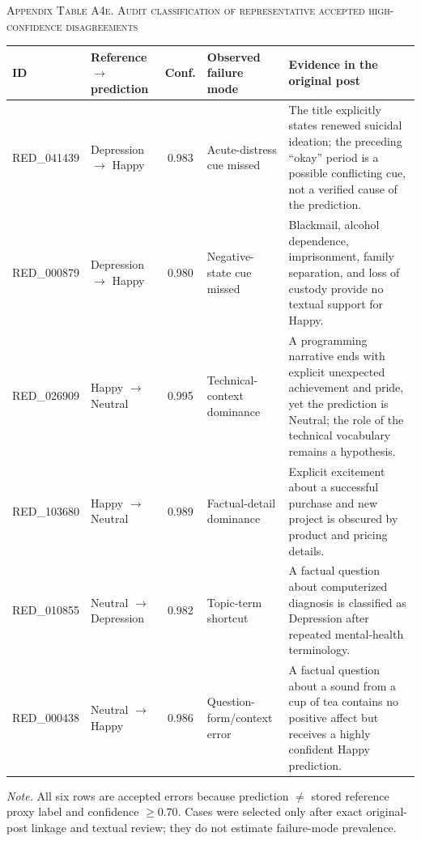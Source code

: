 \documentclass{ieeeaccess}
\begin{document}
\par\medskip
{}
\noindent\textsc{Appendix Table A4e. Audit classification of representative accepted high-confidence disagreements}\par
\label{tab:appendix-a4e-accepted-errors}
\smallskip
\footnotesize
\setlength{\tabcolsep}{3.2pt}
\renewcommand{\arraystretch}{1.16}
\noindent\begin{tabularx}{\textwidth}{@{}p{}p{}c p{}Y@{}}
\toprule
ID & Reference $\rightarrow$ prediction & Conf. & Observed failure mode & Evidence in the original post \\
\midrule
RED\_041439 & Depression $\rightarrow$ Happy & 0.983 & Acute-distress cue missed & The title explicitly states renewed suicidal ideation; the preceding ``okay'' period is a possible conflicting cue, not a verified cause of the prediction. \\
RED\_000879 & Depression $\rightarrow$ Happy & 0.980 & Negative-state cue missed & Blackmail, alcohol dependence, imprisonment, family separation, and loss of custody provide no textual support for Happy. \\
RED\_026909 & Happy $\rightarrow$ Neutral & 0.995 & Technical-context dominance & A programming narrative ends with explicit unexpected achievement and pride, yet the prediction is Neutral; the role of the technical vocabulary remains a hypothesis. \\
RED\_103680 & Happy $\rightarrow$ Neutral & 0.989 & Factual-detail dominance & Explicit excitement about a successful purchase and new project is obscured by product and pricing details. \\
RED\_010855 & Neutral $\rightarrow$ Depression & 0.982 & Topic-term shortcut & A factual question about computerized diagnosis is classified as Depression after repeated mental-health terminology. \\
RED\_000438 & Neutral $\rightarrow$ Happy & 0.986 & Question-form/context error & A factual question about a sound from a cup of tea contains no positive affect but receives a highly confident Happy prediction. \\
\bottomrule
\end{tabularx}
\par\smallskip
\noindent\footnotesize\textit{Note.} All six rows are accepted errors because prediction $\ne$ stored reference proxy label and confidence $\geq0.70$. Cases were selected only after exact original-post linkage and textual review; they do not estimate failure-mode prevalence.\normalsize
\end{document}

